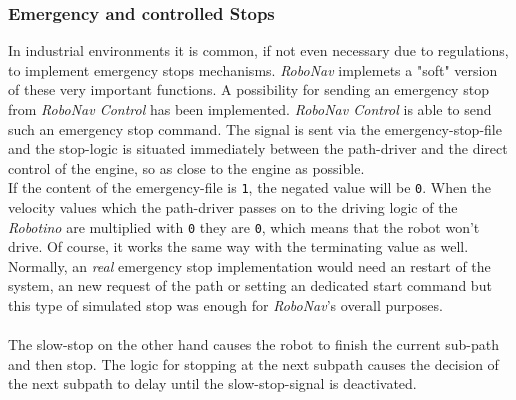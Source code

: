 \subsubsection{Emergency and controlled Stops}
\label{subsubsec:stoppingtherobotino}
In industrial environments it is common, if not even necessary due to regulations, to implement emergency stops mechanisms. \textit{RoboNav} implemets a "soft" version of these very important functions.
A possibility for sending an emergency stop from \textit{RoboNav Control} has been implemented. 
\textit{RoboNav Control} is able to send such an emergency stop command. The signal is sent via the emergency-stop-file and the stop-logic is situated immediately between the path-driver and the direct control of the engine, so as close to the engine as possible. \\
If the content of the emergency-file is \texttt{1}, the negated value will be \texttt{0}. When the velocity values which the path-driver passes on to the driving logic of the \textit{Robotino} are multiplied with \texttt{0} they are \texttt{0}, which means that the robot won't drive. Of course, it works the same way with the terminating value as well. \\
Normally, an \textit{real} emergency stop implementation would need an restart of the system, an new request of the path or setting an dedicated start command but this type of simulated stop was enough for \textit{RoboNav}'s overall purposes. \\\\
The slow-stop on the other hand causes the robot to finish the current sub-path and then stop. The logic for stopping at the next subpath causes the decision of the next subpath to delay until the slow-stop-signal is deactivated.






